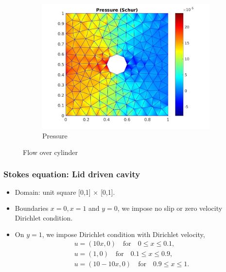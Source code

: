 \documentclass{beamer}
\begin{document}
\begin{frame}
\begin{figure}
\begin{subfigure}{0.3\textwidth}
    \includegraphics[width=\linewidth]{cylinder_schur_pressure.jpg}
    \caption{Pressure}
      \label{pressure_stoke_schur}
\end{subfigure}
\caption{Flow over cylinder}
\label{flow_over_cylinder_schur}
\end{figure}

\end{frame}
\begin{frame}
\frametitle{Stokes equation: Lid driven cavity}
\begin{itemize}
\item Domain: unit square [0,1] $\times$ [0,1].
\item Boundaries ${x = 0}, {x = 1}$ and ${y = 0}$, we impose no slip or zero velocity Dirichlet condition. 
\item On ${y = 1}$, we impose Dirichlet condition with Dirichlet velocity,
\begin{equation}
\begin{split}
u = (10x,0) \quad \textrm{for} \quad 0 \leq x \leq 0.1 \textrm{,}\\
u = (1,0) \quad \textrm{for} \quad 0.1 \leq x \leq 0.9 \textrm{,}\\
u = (10 - 10x,0) \quad \textrm{for} \quad 0.9 \leq x \leq 1 \textrm{.}
\end{split}
\end{equation}
\end{itemize}
\end{frame}
\end{document}
